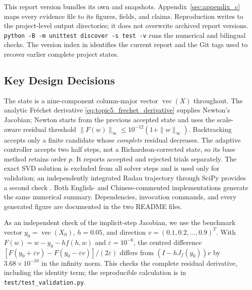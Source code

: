 This report version bundles its own  and 
snapshots. Appendix~\ref{sec:appendix_c} maps every evidence file to
its figures, fields, and claims. Reproduction writes to the project-level
output directories; it does not overwrite archived report versions.
\texttt{python -B -m unittest discover -s test -v} runs the numerical
and bilingual checks. The version index in
 identifies the current report and
the Git tags used to recover earlier complete project states.

\subsection{Key Design Decisions}
The state is a nine-component column-major vector
$\operatorname{vec}(X)$ throughout. The analytic Fr\'echet derivative
\eqref{eq:topic5_frechet_derivative} supplies Newton's Jacobian;
Newton starts from the previous accepted state and uses the
scale-aware residual threshold
$\|F(w)\|_\infty\leq10^{-12}(1+\|w\|_\infty)$.
Backtracking accepts only a finite candidate whose \emph{complete}
residual decreases. The adaptive controller accepts two half steps,
not a Richardson-corrected state, so its base method retains order
$p$. It reports accepted and rejected trials separately. The exact
SVD solution is excluded from all solver steps and is used only for
validation; an independently integrated Radau trajectory through
SciPy provides a second check \cite{virtanen2020}. Both English- and Chinese-commented implementations
generate the same numerical summary. Dependencies, invocation
commands, and every generated figure are documented in the two
README files.

As an independent check of the implicit-step Jacobian, we use the
benchmark vector $y_0=\operatorname{vec}(X_0)$, $h=0.05$, and direction
$v=(0.1,0.2,\ldots,0.9)^T$. With
$F(w)=w-y_0-hf(h,w)$ and $\varepsilon=10^{-6}$, the centred difference
$[F(y_0+\varepsilon v)-F(y_0-\varepsilon v)]/(2\varepsilon)$ differs
from $(I-hJ_f(y_0))v$ by $3.68\times10^{-10}$ in the infinity norm.
This checks the complete residual derivative, including the identity
term; the reproducible calculation is in
\texttt{test/test\_validation.py}.

\newpage
